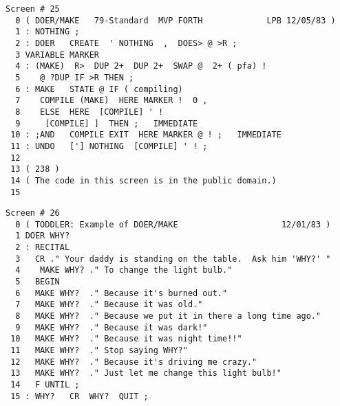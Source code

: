 \begin{verbatim}
Screen # 25
  0 ( DOER/MAKE   79-Standard  MVP FORTH             LPB 12/05/83 )
  1 : NOTHING ;
  2 : DOER   CREATE  ' NOTHING  ,  DOES> @ >R ;
  3 VARIABLE MARKER
  4 : (MAKE)  R>  DUP 2+  DUP 2+  SWAP @  2+ ( pfa) !
  5    @ ?DUP IF >R THEN ;
  6 : MAKE   STATE @ IF ( compiling)
  7    COMPILE (MAKE)  HERE MARKER !  0 ,
  8    ELSE  HERE  [COMPILE] ' !
  9     [COMPILE] ]  THEN ;   IMMEDIATE
 10 : ;AND   COMPILE EXIT  HERE MARKER @ ! ;   IMMEDIATE
 11 : UNDO   ['] NOTHING  [COMPILE] ' ! ;
 12
 13 ( 238 )
 14 ( The code in this screen is in the public domain.)
 15
\end{verbatim}

\begin{verbatim}
Screen # 26
  0 ( TODDLER: Example of DOER/MAKE                     12/01/83 )
  1 DOER WHY?
  2 : RECITAL
  3   CR ." Your daddy is standing on the table.  Ask him 'WHY?' "
  4    MAKE WHY? ." To change the light bulb."
  5   BEGIN
  6   MAKE WHY?  ." Because it's burned out."
  7   MAKE WHY?  ." Because it was old."
  8   MAKE WHY?  ." Because we put it in there a long time ago."
  9   MAKE WHY?  ." Because it was dark!"
 10   MAKE WHY?  ." Because it was night time!!"
 11   MAKE WHY?  ." Stop saying WHY?"
 12   MAKE WHY?  ." Because it's driving me crazy."
 13   MAKE WHY?  ." Just let me change this light bulb!"
 14   F UNTIL ;
 15 : WHY?   CR  WHY?  QUIT ;
\end{verbatim}
